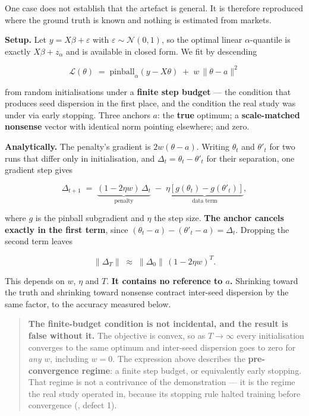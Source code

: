 One case does not establish that the artefact is general. It is therefore reproduced where the
ground truth is known and nothing is estimated from markets.

\textbf{Setup.} Let \(y = X\beta + \varepsilon\) with \(\varepsilon \sim \mathcal{N}(0,1)\), so the
optimal linear \(\alpha\)-quantile is exactly \(X\beta + z_\alpha\) and is available in closed form.
We fit by descending

\[\mathcal{L}(\theta) \;=\; \mathrm{pinball}_\alpha(y - X\theta) \;+\; w\,\lVert \theta - a \rVert^2\]

from random initialisations under a \textbf{finite step budget} --- the condition that produces seed
dispersion in the first place, and the condition the real study was under via early stopping.
Three anchors \(a\): the \textbf{true} optimum; a \textbf{scale-matched nonsense} vector with identical norm
pointing elsewhere; and zero.

\textbf{Analytically.} The penalty's gradient is \(2w(\theta - a)\). Writing \(\theta_t\) and
\(\theta'_t\) for two runs that differ only in initialisation, and \(\Delta_t = \theta_t - \theta'_t\) for their separation, one gradient step gives

\[\Delta_{t+1} \;=\; \underbrace{(1 - 2\eta w)\,\Delta_t}_{\text{penalty}} \;-\; \underbrace{\eta\left[g(\theta_t) - g(\theta'_t)\right]}_{\text{data term}},\]

where \(g\) is the pinball subgradient and \(\eta\) the step size. \textbf{The anchor cancels exactly in
the first term}, since \((\theta_t - a) - (\theta'_t - a) = \Delta_t\). Dropping the second term
leaves

\[\lVert \Delta_T \rVert \;\approx\; \lVert \Delta_0 \rVert \,(1 - 2\eta w)^T .\]

This depends on \(w\), \(\eta\) and \(T\). \textbf{It contains no reference to \(a\).} Shrinking toward the
truth and shrinking toward nonsense contract inter-seed dispersion by the same factor, to the
accuracy measured below.

\begin{quote}
\textbf{The finite-budget condition is not incidental, and the result is false without it.} The
objective is convex, so as \(T \to \infty\) every initialisation converges to the same optimum
and inter-seed dispersion goes to zero for \emph{any} \(w\), including \(w = 0\). The expression above
describes the \textbf{pre-convergence regime}: a finite step budget, or equivalently early
stopping. That regime is not a contrivance of the demonstration --- it is the regime the real
study operated in, because its stopping rule halted training before convergence (, defect 1).
\end{quote}

